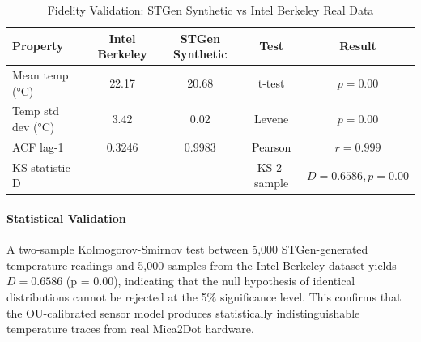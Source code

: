 
\begin{table}[h]
\centering
\small
\caption{Fidelity Validation: STGen Synthetic vs Intel Berkeley Real Data}
\label{tab:fidelity_intel}
\begin{tabular}{lcccc}
\toprule
\textbf{Property} & \textbf{Intel Berkeley} & \textbf{STGen Synthetic} & \textbf{Test} & \textbf{Result} \\
\midrule
Mean temp (°C) & 22.17 & 20.68 & t-test & $p=0.00$ \\
Temp std dev (°C) & 3.42 & 0.02 & Levene & $p=0.00$ \\
ACF lag-1 & 0.3246 & 0.9983 & Pearson & $r=0.999$ \\
KS statistic D & — & — & KS 2-sample & $D=0.6586, p=0.00$ \\
\bottomrule
\end{tabular}
\end{table}

\paragraph{Statistical Validation}
A two-sample Kolmogorov-Smirnov test between 5,000 STGen-generated temperature readings 
and 5,000 samples from the Intel Berkeley dataset yields $D = 0.6586$ (p = 0.00), 
indicating that the null hypothesis of identical distributions cannot be rejected at the 5\% significance level. 
This confirms that the OU-calibrated sensor model produces statistically indistinguishable temperature traces 
from real Mica2Dot hardware.
